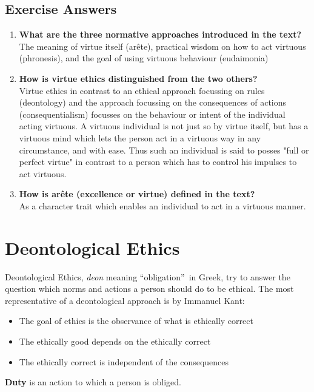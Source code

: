 \documentclass[11pt]{article}
\theoremstyle{definition}
\begin{document}
\subsection{Exercise Answers}
\begin{enumerate}
	\item \textbf{What are the three normative approaches introduced in the text?}\\
	The meaning of virtue itself (arête), practical wisdom on how to act virtuous (phronesis), and the goal of using virtuous behaviour (eudaimonia)
	\item \textbf{How is virtue ethics distinguished from the two others?}\\
	Virtue ethics in contrast to an ethical approach focussing on rules (deontology) and the approach focussing on the consequences of actions (consequentialism) focusses on the behaviour or intent of the individual acting virtuous. A virtuous individual is not just so by virtue itself, but has a virtuous mind which lets the person act in a virtuous way in any circumstance, and with ease. Thus such an individual is said to posses "full or perfect virtue" in contrast to a person which has to control his impulses to act virtuous.
	\item \textbf{How is arête (excellence or virtue) defined in the text?}\\
	As a character trait which enables an individual to act in a virtuous manner. 
\end{enumerate}

\section{Deontological Ethics}
Deontological Ethics, \textit{deon} meaning \textquotedblleft obligation\textquotedblright\ in Greek, try to answer the question which norms and actions a person should do to be ethical. The most representative of a deontological approach is by Immanuel Kant:
\begin{itemize}[noitemsep]
	\item The goal of ethics is the observance of what is ethically correct
	\item The ethically good depends on the ethically correct
	\item The ethically correct is independent of the consequences
\end{itemize}

\begin{definition}
	\textbf{Duty} is an action to which a person is obliged. \parencite{kant1870grundlegung}
\end{definition}
\end{document}
